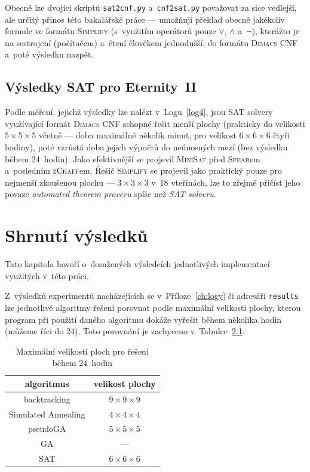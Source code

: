 \documentclass[11pt, titlepage]{report}
\begin{document}
Obecně lze dvojici skriptů \texttt{sat2cnf.py} a~\texttt{cnf2sat.py} považovat za sice vedlejší, ale určitý přínos této bakalářské práce --- umožňují překlad obecně jakékoliv formule ve formátu \textsc{Simplify} (s~využitím operátorů pouze $\vee$, $\wedge$ a~$\neg$), kterážto je na sestrojení (počítačem) a~čtení člověkem jednodušší, do formátu \textsc{Dimacs CNF} a~poté výsledku nazpět.

\section{Výsledky SAT pro Eternity~II}
\label{sec:sat-vysl}

Podle měření, jejichž výsledky lze nalézt v~Logu~\ref{log4}, jsou SAT solvery využívající formát \textsc{Dimacs CNF} schopné řešit menší plochy (prakticky do velikosti $5 \times 5 \times 5$ včetně --- doba maximálně několik minut, pro velikost $6 \times 6 \times 6$ čtyři hodiny), poté vzrůstá doba jejich výpočtů do neúnosných mezí (bez výsledku během 24~hodin). Jako efektivnější se projevil \textsc{MiniSat} před \textsc{Spear}em a~posledním \textsc{zChaff}em. Řešič \textsc{Simplify} se projevil jako praktický pouze pro nejmenší zkoušenou plochu --- $3 \times 3 \times 3$ v~18 vteřinách, lze to zřejmě přičíst jeho povaze \emph{automated theorem proveru} spíše než \emph{SAT solveru}.


\chapter{Shrnutí výsledků}
\label{ch:vysledky}

Tato kapitola hovoří o~dosažených výsledcích jednotlivých implementací využitých v~této práci.

Z~výsledků experimentů nacházejících se v~Příloze~\ref{ch:logy} či adresáři \texttt{results} lze jednotlivé algoritmy řešení porovnat podle maximální velikosti plochy, kterou program při použití daného algoritmu dokáže vyřešit během několika hodin (můžeme říci do 24). Toto porovnání je zachyceno v~Tabulce~\ref{tabulka-rychlosti}.

\begin{table}[ht]
\centering
\begin{tabular}{|c|c|}
\hline
\textbf{algoritmus} & \textbf{velikost plochy} \\ \hline
backtracking & $9 \times 9 \times 9$ \\ \hline
Simulated Annealing & $4 \times 4 \times 4$ \\ \hline
pseudoGA & $5 \times 5 \times 5$ \\ \hline
GA & --- \\ \hline
SAT & $6 \times 6 \times 6$ \\
\hline
\end{tabular}
\caption{Maximální velikosti ploch pro řešení během 24~hodin}
\label{tabulka-rychlosti}
\end{table}
\end{document}
